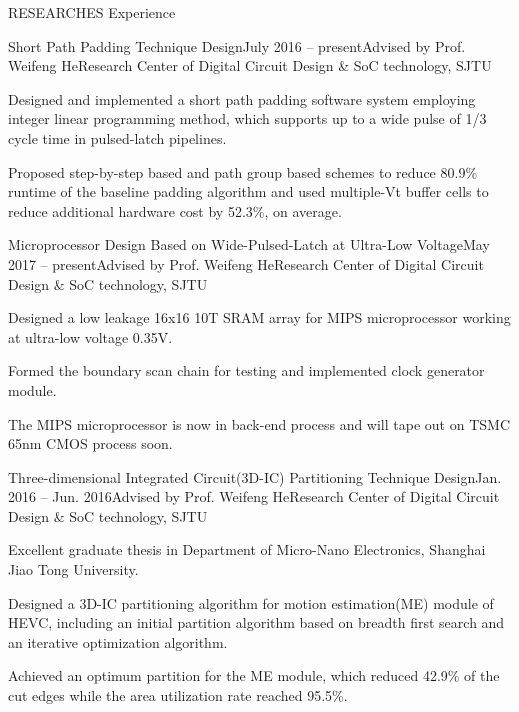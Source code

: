 \documentclass{resume_Stanford} %
\begin{document}
\begin{rSection}{RESEARCHES Experience}

\begin{rSubsection}{Short Path Padding Technique Design}{July 2016 -- present}{Advised by Prof. Weifeng He}{Research Center of Digital Circuit Design \& SoC technology, SJTU}
\item Designed and implemented a short path padding software system employing integer linear programming method, which supports up to a wide pulse of 1/3 cycle time in pulsed-latch pipelines.
\item Proposed step-by-step based and path group based schemes to reduce 80.9\% runtime of the baseline padding algorithm and used multiple-Vt buffer cells to reduce additional hardware cost by 52.3\%, on average. 
\end{rSubsection}

\begin{rSubsection}{Microprocessor Design Based on Wide-Pulsed-Latch at Ultra-Low Voltage}{May 2017 -- present}{Advised by Prof. Weifeng He}{Research Center of Digital Circuit Design \& SoC technology, SJTU}
\item Designed a low leakage 16x16 10T SRAM array for MIPS microprocessor working at ultra-low voltage 0.35V.
\item Formed the boundary scan chain for testing and implemented clock generator module. 
\item The MIPS microprocessor is now in back-end process and will tape out on TSMC 65nm CMOS process soon.
\end{rSubsection}

\begin{rSubsection}{Three-dimensional Integrated Circuit(3D-IC) Partitioning Technique Design}{Jan. 2016 -- Jun. 2016}{Advised by Prof. Weifeng He}{Research Center of Digital Circuit Design \& SoC technology, SJTU}
\item Excellent graduate thesis in Department of Micro-Nano Electronics, Shanghai Jiao Tong University.
\item Designed a 3D-IC partitioning algorithm for motion estimation(ME) module of HEVC, including an initial partition algorithm based on breadth first search and an iterative optimization algorithm.
\item Achieved an optimum partition for the ME module, which reduced 42.9\% of the cut edges while the area utilization rate reached 95.5\%.
\end{rSubsection}


\end{rSection}
\end{document}
